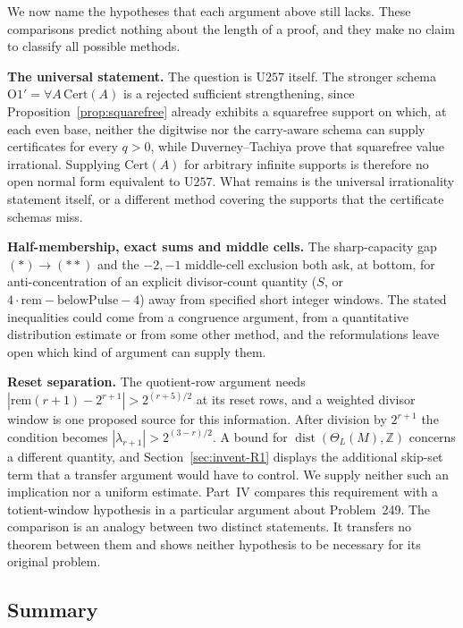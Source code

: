 We now name the hypotheses that each argument above still lacks.  These
comparisons predict nothing about the length of a proof, and they make no
claim to classify all possible methods.

\textbf{The universal statement.} The question is $\mathrm{U257}$ itself. The stronger schema
$\mathrm{O1'}=\forall A\,\mathrm{Cert}(A)$ is a rejected sufficient strengthening, since
Proposition~\ref{prop:squarefree} already exhibits a squarefree support on which, at each even base, neither the
digitwise nor the carry-aware schema can supply certificates for every $q>0$, while Duverney--Tachiya
prove that squarefree value irrational. Supplying $\mathrm{Cert}(A)$ for arbitrary infinite
supports is therefore no open normal form equivalent to $\mathrm{U257}$.  What remains
is the universal irrationality statement itself, or a different method covering the supports
that the certificate schemas miss.

\textbf{Half-membership, exact sums and middle cells.} The sharp-capacity gap $(\ast)\to(\ast\ast)$ and the
$-2,-1$ middle-cell exclusion both ask, at bottom, for anti-concentration of an explicit
divisor-count quantity ($\ensuremath{S}$, or $4\cdot\mathrm{rem}-\mathrm{belowPulse}-4$)
away from specified short integer windows.  The stated inequalities could come from a
congruence argument, from a quantitative distribution estimate or from some other method,
and the reformulations leave open which kind of argument can supply them.

\textbf{Reset separation.} The quotient-row argument
needs $|\mathrm{rem}(r+1)-2^{r+1}|>2^{(r+5)/2}$ at its reset rows,
and a weighted divisor window is one proposed source for this information.
After division by $2^{r+1}$ the condition becomes
$|\lambda_{r+1}|>2^{(3-r)/2}$.  A bound for
$\operatorname{dist}(\Theta_L(M),\mathbb Z)$ concerns a different
quantity, and Section~\ref{sec:invent-R1} displays the additional
skip-set term that a transfer argument would have to control.
We supply neither such an implication nor a uniform estimate.
Part~IV compares this requirement with a totient-window hypothesis in a particular
argument about Problem~249.  The comparison is an analogy between two distinct
statements.  It transfers no theorem between them and shows neither
hypothesis to be necessary for its original problem.

\subsection{Summary}

